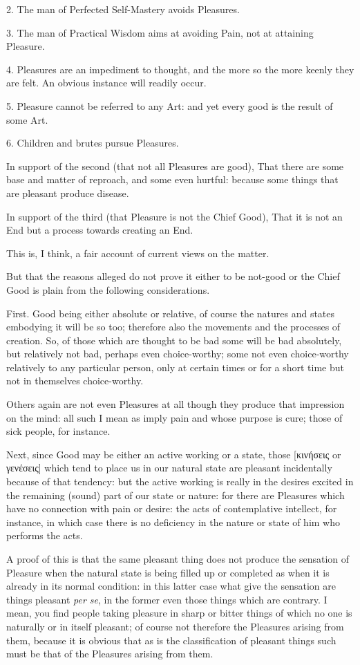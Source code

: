 2. The man of Perfected Self-Mastery avoids Pleasures.

3. The man of Practical Wisdom aims at avoiding Pain, not at attaining
Pleasure.

4. Pleasures are an impediment to thought, and the more so the more keenly they
are felt. An obvious instance will readily occur.

5. Pleasure cannot be referred to any Art: and yet every good is the result of
some Art.

6. Children and brutes pursue Pleasures.

In support of the second (that not all Pleasures are good), That there are some
base and matter of reproach, and some even hurtful: because some things that
are pleasant produce disease.

In support of the third (that Pleasure is not the Chief Good), That it is not
an End but a process towards creating an End.

This is, I think, a fair account of current views on the matter.

But that the reasons alleged do not prove it either to be not-good or the Chief
Good is plain from the following considerations.

First. Good being either absolute or relative, of course the natures and states
embodying it will be so too; therefore also the movements and the processes of
creation. So, of those which are thought to be bad some will be bad absolutely,
but relatively not bad, perhaps even choice-worthy; some not even choice-worthy
relatively to any particular person, only at certain times or for a short time
but not in themselves choice-worthy.

Others again are not even Pleasures at all though they produce that impression
on the mind: all such I mean as imply pain and whose purpose is cure; those of
sick people, for instance.

Next, since Good may be either an active working or a state, those
[κινήσεις or
γενέσεις] which tend to place us in
our natural state are pleasant incidentally because of that tendency: but the
active working is really in the desires excited in the remaining (sound) part
of our state or nature: for there are Pleasures which have no connection with
pain or desire: the acts of contemplative intellect, for instance, in which
case there is no deficiency in the nature or state of him who performs the
acts.

A proof of this is that the same pleasant thing does not produce the sensation
of Pleasure when the natural state is being filled up or completed as when it
is already in its normal condition: in this latter case what give the sensation
are things pleasant \emph{per se}, in the former even those things which are
contrary. I mean, you find people taking pleasure in sharp or bitter things of
which no one is naturally or in itself pleasant; of course not therefore the
Pleasures arising from them, because it is obvious that as is the
classification of pleasant things such must be that of the Pleasures arising
from them.

